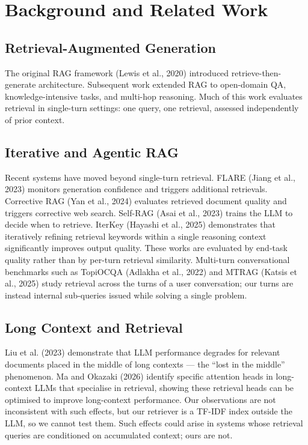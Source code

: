 \documentclass[11pt,a4paper]{article}
\begin{document}
\section{Background and Related Work}

\subsection{Retrieval-Augmented Generation}
The original RAG framework (Lewis et al., 2020) introduced retrieve-then-generate architecture. Subsequent
work extended RAG to open-domain QA, knowledge-intensive tasks, and multi-hop reasoning. Much of this
work evaluates retrieval in single-turn settings: one query, one retrieval, assessed independently of prior
context.

\subsection{Iterative and Agentic RAG}
Recent systems have moved beyond single-turn retrieval. FLARE (Jiang et al., 2023) monitors generation
confidence and triggers additional retrievals. Corrective RAG (Yan et al., 2024) evaluates retrieved
document quality and triggers corrective web search. Self-RAG (Asai et al., 2023) trains the LLM to decide
when to retrieve. IterKey (Hayashi et al., 2025) demonstrates that iteratively refining retrieval keywords within
a single reasoning context significantly improves output quality. These works are evaluated by end-task
quality rather than by per-turn retrieval similarity. Multi-turn conversational benchmarks such as TopiOCQA
(Adlakha et al., 2022) and MTRAG (Katsis et al., 2025) study retrieval across the turns of a user conversation;
our turns are instead internal sub-queries issued while solving a single problem.

\subsection{Long Context and Retrieval}
Liu et al. (2023) demonstrate that LLM performance degrades for relevant documents placed in the middle of
long contexts --- the ``lost in the middle'' phenomenon. Ma and Okazaki (2026) identify specific attention
heads in long-context LLMs that specialise in retrieval, showing these retrieval heads can be optimised to
improve long-context performance. Our observations are not inconsistent with such effects, but our retriever
is a TF-IDF index outside the LLM, so we cannot test them. Such effects could arise in systems whose
retrieval queries are conditioned on accumulated context; ours are not.
\end{document}
